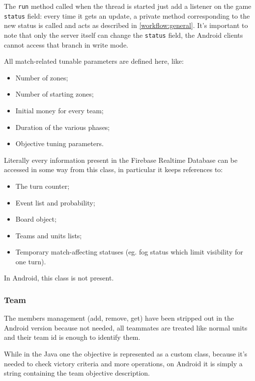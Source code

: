 				The \lstinline|run| method called when the thread is started just add a listener on the game \lstinline|status| field: every time it gets an update, a private method corresponding to the new status is called and acts as described in \autoref{workflow:general}.
				It's important to note that only the server itself can change the \lstinline|status| field, the Android clients cannot access that branch in write mode.
				
				All match-related tunable parameters are defined here, like:
				\begin{itemize}
					\item Number of zones;
					\item Number of starting zones;
					\item Initial money for every team;
					\item Duration of the various phases;
					\item Objective tuning parameters.
				\end{itemize}
			
				Literally every information present in the Firebase Realtime Database can be accessed in some way from this class, in particular it keeps references to:
				\begin{itemize}
					\item The turn counter;
					\item Event list and probability;
					\item Board object;
					\item Teams and units lists;
					\item Temporary match-affecting statuses (eg. fog status which limit visibility for one turn).
				\end{itemize}
			
				In Android, this class is not present.
				
			\subsubsection{Team}
			
				The members management (add, remove, get) have been stripped out in the Android version because not needed, all teammates are treated like normal units and their team id is enough to identify them. 
				
				While in the Java one the objective is represented as a custom class, because it's needed to check victory criteria and more operations, on Android it is simply a string containing the team objective description.
				
